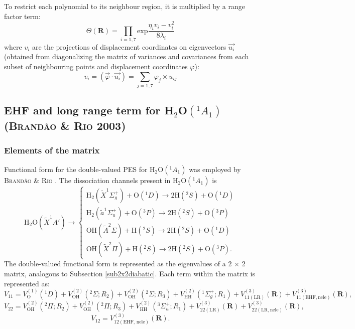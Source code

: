 \documentclass[12pt]{article}
\begin{document}
To restrict each polynomial to its neighbour region, it is multiplied by a range factor term:
\begin{equation}
    \mathbf{\mathit{\Theta}(R)} = \prod_{i=1,7}\text{exp}\frac{\eta_iv_i-v_i^2}{8\lambda_i}
\label{eq3x3rangefactor}
\end{equation}
where $v_i$ are the projections of displacement coordinates on eigenvectors $\Vec{u_i}$ (obtained from diagonalizing the matrix of variances and covariances from each subset of neighbouring points and displacement coordinates $\varphi$):
\begin{equation}
    v_i = (\Vec{\varphi} \cdot \Vec{u_i}) = \sum_{j=1,7} \varphi_j \times u_{ij}
\label{eq3x3vi}
\end{equation}
\fi

\subsection{EHF and long range term for H$_2$O$(^1A_1)$ (\textsc{Brandão \& Rio} 2003)}
\label{subsecehf}
\subsubsection{Elements of the matrix}
\label{subsubmatrix}
Functional form for the double-valued PES for H$_2$O$(^1A_1)$ was employed by \textsc{Brandão \& Rio} \cite{idx41}. The dissociation channels present in H$_2$O$(^1A_1)$ is
\begin{equation}
    \text{H}_2\text{O}(\widetilde{X}^1A') \rightarrow
    \begin{cases}
        \text{H}_2(\widetilde{X}^1\Sigma_g^+) + \text{O}(^1D)\rightarrow2\text{H}(^2S) + \text{O}(^1D)\\
        \text{H}_2(\widetilde{a}^1\Sigma_u^+) + \text{O}(^3P)\rightarrow2\text{H}(^2S) + \text{O}(^3P)\\
        \text{OH}(\widetilde{A}^2\Sigma) + \text{H}(^2S)\rightarrow2\text{H}(^2S) + \text{O}(^1D)\\
        \text{OH}(\widetilde{X}^2\Pi) + \text{H}(^2S)\rightarrow2\text{H}(^2S) + \text{O}(^3P).
    \end{cases}
\end{equation}
The double-valued functional form is represented as the eigenvalues of a 2 $\times$ 2 matrix, analogous to Subsection \ref{sub2x2diabatic}. Each term within the matrix is represented as:
\begin{equation}
    V_{11} = V_\text{O}^{(1)}(^1D)+ V_\text{OH}^{(2)}(^2\Sigma; R_2) + V_\text{OH}^{(2)}(^2\Sigma; R_3) + V_\text{HH}^{(2)}(^1\Sigma_g^+; R_1) + V_{11(\text{LR})}^{(3)}(\mathbf{R}) + V_{11(\text{EHF},\text{nele})}^{(3)}(\mathbf{R}),
\label{eqehfv11}
\end{equation}
\begin{equation}
    V_{22} =  V_\text{OH}^{(2)}(^2\Pi; R_2) + V_\text{OH}^{(2)}(^2\Pi; R_3) + V_\text{HH}^{(2)}(^3\Sigma_u^+; R_1) + V_{22(\text{LR})}^{(3)}(\mathbf{R}) + V_{22(\text{LR},\text{nele})}^{(3)}(\mathbf{R}),
\label{eqehfv22}
\end{equation}
\begin{equation}
    V_{12} = V_{12(\text{EHF, nele})}^{(3)}(\mathbf{R}).
\end{equation}
\end{document}
